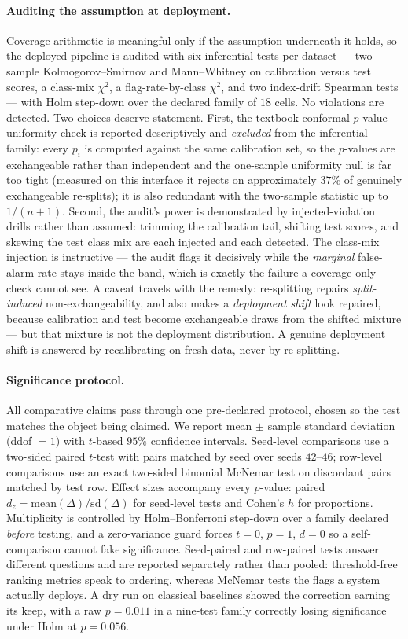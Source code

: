 \paragraph{Auditing the assumption at deployment.}
Coverage arithmetic is meaningful only if the assumption underneath it holds, so the deployed pipeline is
audited with six inferential tests per dataset --- two-sample Kolmogorov--Smirnov and Mann--Whitney on
calibration versus test scores, a class-mix $\chi^2$, a flag-rate-by-class $\chi^2$, and two index-drift
Spearman tests --- with Holm step-down over the declared family of $18$ cells. No violations are detected.
Two choices deserve statement. First, the textbook conformal $p$-value uniformity check is reported
descriptively and \emph{excluded} from the inferential family: every $p_i$ is computed against the same
calibration set, so the $p$-values are exchangeable rather than independent and the one-sample uniformity
null is far too tight (measured on this interface it rejects on approximately $37\%$ of genuinely
exchangeable re-splits); it is also redundant with the two-sample statistic up to $1/(n+1)$. Second, the
audit's power is demonstrated by injected-violation drills rather than assumed: trimming the calibration
tail, shifting test scores, and skewing the test class mix are each injected and each detected. The
class-mix injection is instructive --- the audit flags it decisively while the \emph{marginal} false-alarm
rate stays inside the band, which is exactly the failure a coverage-only check cannot see. A caveat travels
with the remedy: re-splitting repairs \emph{split-induced} non-exchangeability, and also makes a
\emph{deployment shift} look repaired, because calibration and test become exchangeable draws from the
shifted mixture --- but that mixture is not the deployment distribution. A genuine deployment shift is
answered by recalibrating on fresh data, never by re-splitting.

\paragraph{Significance protocol.}
All comparative claims pass through one pre-declared protocol, chosen so the test matches the object being
claimed. We report mean $\pm$ sample standard deviation (ddof $=1$) with $t$-based $95\%$ confidence
intervals. Seed-level comparisons use a two-sided paired $t$-test with pairs matched by seed over seeds
$42$--$46$; row-level comparisons use an exact two-sided binomial McNemar test on discordant pairs matched
by test row. Effect sizes accompany every $p$-value: paired $d_z = \mathrm{mean}(\Delta)/\mathrm{sd}(\Delta)$
for seed-level tests and Cohen's $h$ for proportions. Multiplicity is controlled by Holm--Bonferroni
step-down over a family declared \emph{before} testing, and a zero-variance guard forces $t = 0$, $p = 1$,
$d = 0$ so a self-comparison cannot fake significance. Seed-paired and row-paired tests answer different
questions and are reported separately rather than pooled: threshold-free ranking metrics speak to ordering,
whereas McNemar tests the flags a system actually deploys. A dry run on classical baselines showed the
correction earning its keep, with a raw $p = 0.011$ in a nine-test family correctly losing significance
under Holm at $p = 0.056$.

